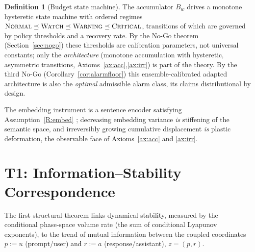 \documentclass[11pt]{article}
\theoremstyle{plain}
\theoremstyle{definition}
\newtheorem{definition}[theorem]{Definition}
\theoremstyle{remark}
\begin{document}
\begin{definition}[Budget state machine]\label{def:budget}
The accumulator $B_w$ drives a monotone hysteretic state machine with ordered regimes $\textsc{Normal}\preceq\textsc{Watch}\preceq\textsc{Warning}\preceq\textsc{Critical}$, transitions of which are governed by policy thresholds and a recovery rate. By the No-Go theorem (Section~\ref{sec:nogo}) these thresholds are calibration parameters, not universal constants; only the \emph{architecture} (monotone accumulation with hysteretic, asymmetric transitions, Axioms~\ref{ax:acc},\ref{ax:irr}) is part of the theory. By the third No-Go (Corollary~\ref{cor:alarmfloor}) this ensemble-calibrated adapted architecture is also the \emph{optimal} admissible alarm class, its claims distributional by design.
\end{definition}

The embedding instrument is a sentence encoder satisfying Assumption~\ref{R:embed} \citep{reimers2019}; decreasing embedding variance \emph{is} stiffening of the semantic space, and irreversibly growing cumulative displacement \emph{is} plastic deformation, the observable face of Axioms~\ref{ax:acc} and \ref{ax:irr}.

\section{T1: Information--Stability Correspondence}\label{sec:t1}

The first structural theorem links dynamical stability, measured by the conditional phase-space volume rate (the sum of conditional Lyapunov exponents), to the trend of mutual information between the coupled coordinates $p:=u$ (prompt/user) and $r:=a$ (response/assistant), $z=(p,r)$.
\end{document}
